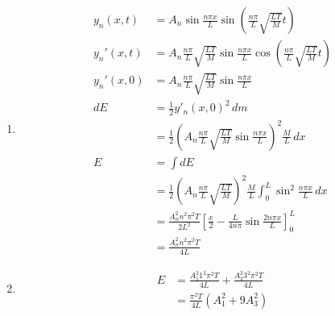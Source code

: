 \documentclass{article}
\begin{document}
\begin{enumerate}
  \item

        \begin{align*}
          y_n(x, t)  & = A_n \sin \frac{n \pi x}{L} \sin \left( \frac{n \pi}{L} \sqrt{\frac{L T}{M}} t \right)                                      \\
          y_n'(x, t) & = A_n \frac{n \pi}{L} \sqrt{\frac{L T}{M}} \sin \frac{n \pi x}{L} \cos \left( \frac{n \pi}{L} \sqrt{\frac{L T}{M}} t \right) \\
          y_n'(x, 0) & = A_n \frac{n \pi}{L} \sqrt{\frac{L T}{M}} \sin \frac{n \pi x}{L}                                                            \\
          dE         & = \frac{1}{2} y'_n(x, 0)^2 \,dm                                                                                              \\
                     & = \frac{1}{2} \left( A_n \frac{n \pi}{L} \sqrt{\frac{L T}{M}} \sin \frac{n \pi x}{L} \right)^2 \frac{M}{L} \,dx              \\
          E          & = \int dE                                                                                                                    \\
                     & = \frac{1}{2} \left( A_n \frac{n \pi}{L} \sqrt{\frac{L T}{M}} \right)^2 \frac{M}{L} \int_0^L \sin^2 \frac{n \pi x}{L} \,dx   \\
                     & = \frac{A_n^2 n^2 \pi^2 T}{2 L^2} \left[ \frac{x}{2} - \frac{L}{4 n \pi} \sin \frac{2 n \pi x}{L} \right]_0^L                \\
                     & = \frac{A_n^2 n^2 \pi^2 T}{4 L}
        \end{align*}

  \item

        \begin{align*}
          E & = \frac{A_1^2 1^2 \pi^2 T}{4 L} + \frac{A_3^2 3^2 \pi^2 T}{4 L} \\
            & = \frac{\pi^2 T}{4 L} (A_1^2 + 9 A_3^2)
        \end{align*}
\end{enumerate}

\subsection{}
\end{document}
